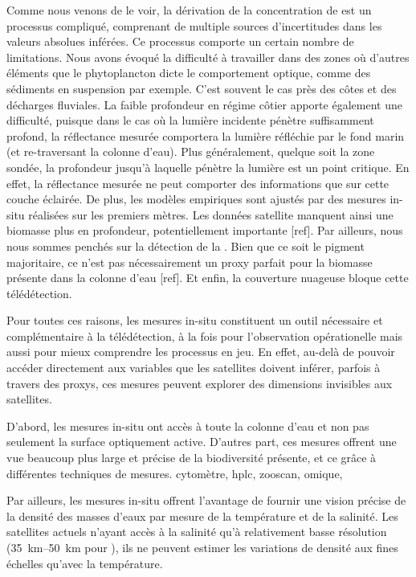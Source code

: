 Comme nous venons de le voir, la dérivation de la concentration de  est un processus compliqué, comprenant de multiple sources d'incertitudes dans les valeurs absolues inférées.
Ce processus comporte un certain nombre de limitations.
Nous avons évoqué la difficulté à travailler dans des zones où d'autres éléments que le phytoplancton dicte le comportement optique, comme des sédiments en suspension par exemple.
C'est souvent le cas près des côtes et des décharges fluviales.
La faible profondeur en régime côtier apporte également une difficulté, puisque dans le cas où la lumière incidente pénètre suffisamment profond, la réflectance mesurée comportera la lumière réfléchie par le fond marin (et re-traversant la colonne d'eau).
Plus généralement, quelque soit la zone sondée, la profondeur jusqu'à laquelle pénètre la lumière est un point critique.
En effet, la réflectance mesurée ne peut comporter des informations que sur cette couche éclairée.
De plus, les modèles empiriques sont ajustés par des mesures in-situ réalisées sur les premiers mètres.
Les données satellite manquent ainsi une biomasse plus en profondeur, potentiellement importante [ref].
Par ailleurs, nous nous sommes penchés sur la détection de la . Bien que ce soit le pigment majoritaire, ce n'est pas nécessairement un proxy parfait pour la biomasse présente dans la colonne d'eau [ref].
Et enfin, la couverture nuageuse bloque cette télédétection.

Pour toutes ces raisons, les mesures in-situ constituent un outil nécessaire et complémentaire à la télédétection, à la fois pour l'observation opérationelle mais aussi pour mieux comprendre les processus en jeu.
En effet, au-delà de pouvoir accéder directement aux variables que les satellites doivent inférer, parfois à travers des proxys, ces mesures peuvent explorer des dimensions invisibles aux satellites.

D'abord, les mesures in-situ ont accès à toute la colonne d'eau et non pas seulement la surface optiquement active.
D'autres part, ces mesures offrent une vue beaucoup plus large et précise de la biodiversité présente, et ce grâce à différentes techniques de mesures.
cytomètre,
hplc,
zooscan,
omique,

Par ailleurs, les mesures in-situ offrent l'avantage de fournir une vision précise de la densité des masses d'eaux par mesure de la température et de la salinité.
Les satellites actuels n'ayant accès à la salinité qu'à relativement basse résolution (\qtyrange{35}{50}{\km} pour  ), ils ne peuvent estimer les variations de densité aux fines échelles qu'avec la température.

